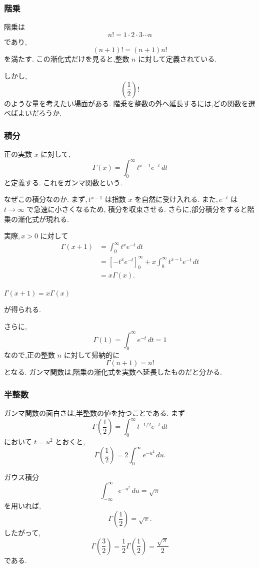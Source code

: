 \subsubsection{階乗}

階乗は
\[
  n!=1\cdot2\cdot3\cdots n
\]
であり,
\[
  (n+1)!=(n+1)n!
\]
を満たす.
この漸化式だけを見ると,整数 $n$ に対して定義されている.

しかし,
\[
  \left(\frac12\right)!
\]
のような量を考えたい場面がある.
階乗を整数の外へ延長するには,どの関数を選べばよいだろうか.

\subsubsection{積分}

正の実数 $x$ に対して,
\[
  \Gamma(x)=\int_0^\infty t^{x-1}e^{-t}\,dt
\]
と定義する.
これをガンマ関数という.

なぜこの積分なのか.
まず,\,$t^{x-1}$ は指数 $x$ を自然に受け入れる.
また,\,$e^{-t}$ は $t\to\infty$ で急速に小さくなるため,
積分を収束させる.
さらに,部分積分をすると階乗の漸化式が現れる.

実際,\,$x>0$ に対して
\[
\begin{aligned}
  \Gamma(x+1)
  &=\int_0^\infty t^x e^{-t}\,dt\\
  &=\left[-t^xe^{-t}\right]_0^\infty
    +x\int_0^\infty t^{x-1}e^{-t}\,dt\\
  &=x\Gamma(x).
\end{aligned}
\]
\begin{mdquote}
  $\Gamma(x+1)=x\Gamma(x)$
\end{mdquote}
が得られる.

さらに,
\[
  \Gamma(1)=\int_0^\infty e^{-t}\,dt=1
\]
なので,正の整数 $n$ に対して帰納的に
\[
  \Gamma(n+1)=n!
\]
となる.
ガンマ関数は,階乗の漸化式を実数へ延長したものだと分かる.

\subsubsection{半整数}

ガンマ関数の面白さは,半整数の値を持つことである.
まず
\[
  \Gamma\left(\frac12\right)
  =\int_0^\infty t^{-1/2}e^{-t}\,dt
\]
において $t=u^2$ とおくと,
\[
  \Gamma\left(\frac12\right)
  =2\int_0^\infty e^{-u^2}\,du.
\]

ガウス積分
\[
  \int_{-\infty}^{\infty}e^{-u^2}\,du=\sqrt{\pi}
\]
を用いれば,
\[
  \Gamma\left(\frac12\right)=\sqrt{\pi}.
\]
したがって,
\[
  \Gamma\left(\frac32\right)
  =\frac12\Gamma\left(\frac12\right)
  =\frac{\sqrt{\pi}}2
\]
である.


